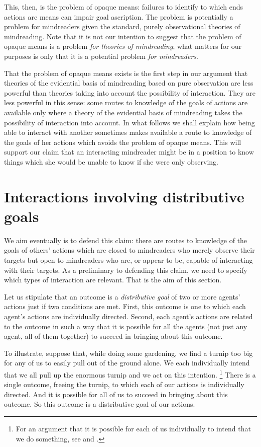 \documentclass[12pt,\papersize]{extarticle}
\begin{document}
This, then, is the problem of opaque means:
failures to identify to which ends actions are means can impair goal ascription.
The problem is potentially a problem for mindreaders given the standard, purely observational theories of mindreading.
Note that it is not our intention to suggest that the problem of opaque means is a problem \emph{for theories of mindreading};
what matters for our purposes is only that it is a potential problem \emph{for mindreaders}.

That the problem of opaque means exists
is the first step in our argument
that 
theories of the evidential basis of mindreading based on pure observation 
are less powerful than theories taking into account the possibility of interaction.
They are less powerful in this sense: 
some routes to knowledge of the goals of actions are available only where a theory of the evidential basis of mindreading 
 takes the possibility of interaction into account.
In what follows we shall explain how being able to interact with another sometimes makes available a route to knowledge of the goals of her actions  which avoids the problem of opaque means.
This will support our claim that an interacting mindreader might be in a position to know things which she would be unable to know if she were only observing.


\section{Interactions involving distributive goals}
\label{sec:joint_action}
We aim eventually is to defend this claim:
there are routes to knowledge of the goals of others' actions
which are closed to
mindreaders who merely observe their targets
but open to 
mindreaders who are, or appear to be, capable of interacting with their targets.
As a preliminary to defending this claim,
we need to specify which types of interaction are relevant.
That is the aim of this section.

Let us stipulate that an outcome is a \emph{distributive goal} of two or more agents' actions just if two conditions are met.
\label{df:distributive_goal}
First, this outcome is  one to which each agent's actions are individually directed.
Second, each agent's actions are related to the outcome in such a way that it is possible for all the agents (not just any agent, all of them together) to succeed in bringing about this outcome.

To illustrate,
suppose that, while doing some gardening,
we find a turnip too big for any of us to easily pull out of the ground alone.
We each individually intend that we all pull up the enormous turnip
and we act on this intention.%
\footnote{
For an argument that it is possible for each of us individually to intend that we do something, see \citet{Bratman:1999fr} and \citet{Bratman:2012fk}.
}
There is a single outcome,
freeing the turnip,
to which each of our actions is individually directed.
And it is possible for all of us to succeed in bringing about this outcome.
So this outcome is a distributive goal of our actions.
\end{document}
